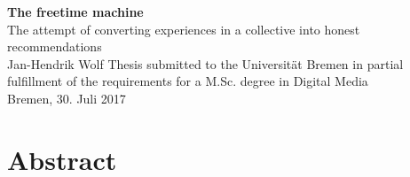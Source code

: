 \documentclass[12pt,numbers=noenddot,parskip,bibliography=totocnumbered,listof=totocnumbered]{scrreprt}
\begin{document}
	
\begin{titlepage}
\null
\vfill

\Huge\textsf{\textbf{The freetime machine
\vspace{0.5em}}}\\
\LARGE\textsf{ The attempt of converting experiences in a collective into honest recommendations }
\vspace{1.5em}\\
\Large\textsf{Jan-Hendrik Wolf}
\vfill
\vfill
\vfill
\small{Thesis submitted to the Universität Bremen in partial fulfillment of the requirements for a M.Sc. degree in Digital Media\\
Bremen, 30. Juli 2017}
\end{titlepage}


\tableofcontents

\chapter*{Abstract}
\end{document}

